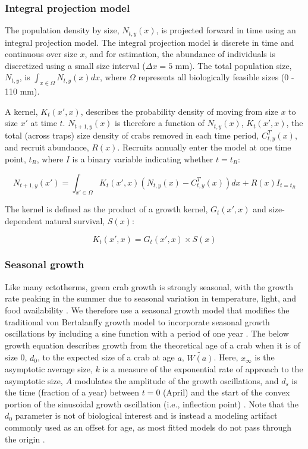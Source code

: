 \documentclass{article}
\begin{document}
\subsubsection*{Integral projection model}

The population density by size, $N_{t, y}(x)$, is projected forward in time using an integral projection model. The integral projection model is discrete in time and continuous over size $x$, and for estimation, the abundance of individuals is discretized using a small size interval ($\Delta x = 5$ mm). The total population size, $N_{t,y}$, is $\int_{x \in \Omega} N_{t, y}(x)dx$, where $\Omega$ represents all biologically feasible sizes (0 - 110 mm).

A kernel, $K_{t}(x', x)$, describes the probability density of moving from size $x$ to size $x'$ at time $t$. $N_{t+1,y}(x)$ is therefore a function of $N_{t,y}(x)$, $K_{t}(x', x)$, the total (across traps) size density of crabs removed in each time period, $C_{t,y}^T(x)$, and recruit abundance, $R(x)$. Recruits annually enter the model at one time point, $t_R$, where $I$ is a binary variable indicating whether $t = t_R$:

\begin{equation}
N_{t+1,y}(x') = \int_{x' \in \Omega} K_{t}(x',x) (N_{t,y}(x) - C_{t,y}^T(x)) dx + R(x)I_{t = t_R}
\end{equation}

The kernel is defined as the product of a growth kernel, $G_t(x',x)$ and size-dependent natural survival, $S(x)$:

\begin{equation}
K_{t}(x',x) = G_t(x',x) \times S(x)
\end{equation}

\subsubsection*{Seasonal growth}

Like many ectotherms, green crab growth is strongly seasonal, with the growth rate peaking in the summer due to seasonal variation in temperature, light, and food availability \parencite{contreras2003population, garcia2012technical}. We therefore use a seasonal growth model that modifies the traditional von Bertalanffy growth model to incorporate seasonal growth oscillations by including a sine function with a period of one year \parencite{beverton2012dynamics, somers1988seasonally}. The below growth equation describes growth from the theoretical age of a crab when it is of size 0, $d_0$, to the expected size of a crab at age $a$, $\widetilde{W(a)}$. Here, $x_{\infty}$ is the asymptotic average size, $k$ is a measure of the exponential rate of approach to the asymptotic size, $A$ modulates the amplitude of the growth oscillations, and $d_s$ is the time (fraction of a year) between $t = 0$ (April) and the start of the convex portion of the sinusoidal growth oscillation (i.e., inflection point) \parencite{garcia2012technical}. Note that the $d_0$ parameter is not of biological interest and is instead a modeling artifact commonly used as an offset for age, as most fitted models do not pass through the origin \parencite{garcia2012technical, schnute1980new}.
\end{document}
